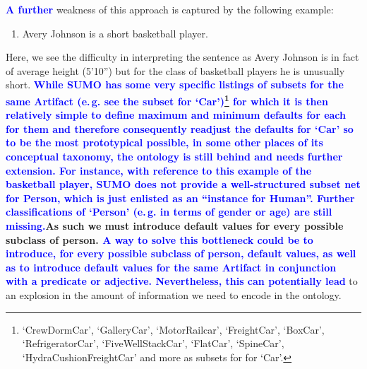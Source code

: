 \documentclass[11pt]{article}
\begin{document}
\textbf{\textcolor{blue}{A further}} weakness of this approach is captured by the following example:

\begin{enumerate}[resume]
    \item Avery Johnson is a short basketball player. \label{ex:avery}
\end{enumerate}

Here, we see the difficulty in interpreting the sentence as Avery Johnson is in fact of average height (5'10'') but
for the class of basketball players he is unusually short. \textbf{\textcolor{blue}{While SUMO has some very specific listings of subsets for the same Artifact (e.\,g. see the subset for `Car')\footnote{`CrewDormCar', `GalleryCar', `MotorRailcar', `FreightCar', `BoxCar', `RefrigeratorCar', `FiveWellStackCar', `FlatCar', `SpineCar', `HydraCushionFreightCar' and more as subsets for for `Car'.} for which it is then relatively simple to define maximum and minimum defaults for each for them and therefore consequently readjust the defaults for `Car' so to be the most prototypical possible, in some other places of its conceptual taxonomy, the ontology is still behind and needs further extension. For instance, with reference to this example of the basketball player, SUMO does not provide a well-structured subset net for Person, which is just enlisted as an ``instance for Human''. Further classifications of `Person' (e.\,g. in terms of gender or age) are still missing.}}\textbf{As such we must introduce default values for
every possible subclass of person. \textcolor{blue}{A way to solve this bottleneck could be to introduce, for every possible subclass of person, default values, as well as to introduce default values for the same Artifact in conjunction with a predicate or adjective. Nevertheless, this can potentially lead}} to an explosion in the amount of information we
need to encode in the ontology.
\end{document}
